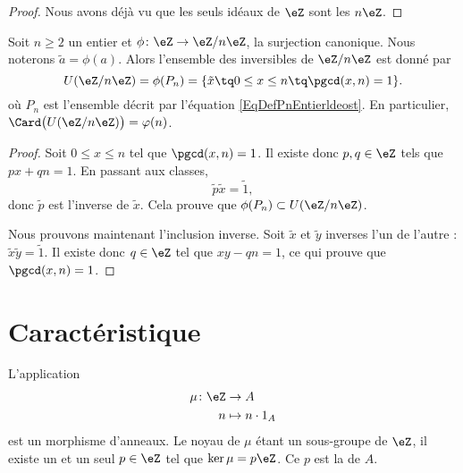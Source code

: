 \begin{proof}
    Nous avons déjà vu que les seuls idéaux de \( \eZ\) sont les \( n\eZ\).
\end{proof}

\begin{proposition}     \label{PropZpintssiprempUzn}
    Soit \( n\geq 2\) un entier et \( \phi\colon \eZ\to \eZ/n\eZ\), la surjection canonique. Nous noterons \( \tilde a=\phi(a)\). Alors l'ensemble des inversibles de \( \eZ/n\eZ\) est donné par
    \begin{equation}
        U(\eZ/n\eZ)=\phi(P_n)=\{ \tilde x\tq 0\leq x\leq n\tq\pgcd(x,n)=1 \}.
    \end{equation}
    où \( P_n\) est l'ensemble décrit par l'équation \eqref{EqDefPnEntierldeost}. En particulier, \( \Card\big( U(\eZ/n\eZ) \big)=\varphi(n)\).

\end{proposition}

\begin{proof}
    Soit \( 0\leq x\leq n\) tel que \( \pgcd(x,n)=1\). Il existe donc \( p,q\in\eZ\) tels que \( px+qn=1\). En passant aux classes,
    \begin{equation}
        \tilde p\tilde x=\tilde 1,
    \end{equation}
    donc \( \tilde p\) est l'inverse de \( \tilde x\). Cela prouve que \( \phi(P_n)\subset U(\eZ/n\eZ)\).

    Nous prouvons maintenant l'inclusion inverse. Soit \( \tilde x\) et \( \tilde y\) inverses l'un de l'autre : $\tilde x\tilde y=\tilde 1$. Il existe donc \( q\in\eZ\) tel que \( xy-qn=1\), ce qui prouve que \( \pgcd(x,n)=1\).
\end{proof}

\section{Caractéristique}

L'application 
\begin{equation}
    \begin{aligned}
        \mu\colon \eZ&\to A \\
        n&\mapsto n\cdot 1_A 
    \end{aligned}
\end{equation}
est un morphisme d'anneaux. Le noyau de \( \mu\) étant un sous-groupe de \( \eZ\), il existe un et un seul \( p\in\eZ\) tel que \( \ker\mu=p\eZ\). Ce \( p\) est la  de \( A\).


